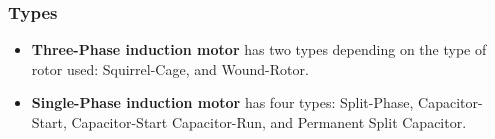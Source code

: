 \documentclass[journal]{IEEEtran}
\begin{document}
\subsubsection{Types}
\begin{itemize}
    \item \textbf{Three-Phase induction motor} has two types depending on the type of rotor used: Squirrel-Cage, and Wound-Rotor\cite{tamer}.
    \item \textbf{Single-Phase induction motor} has four types: Split-Phase, Capacitor-Start, Capacitor-Start Capacitor-Run, and Permanent Split Capacitor.
\end{itemize}

\end{document}
